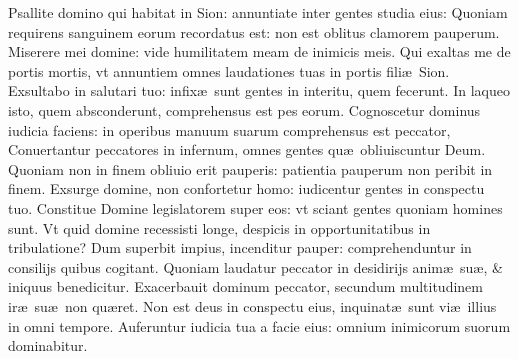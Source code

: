 \documentclass[a5paper,10pt]{book}
\def\ae{æ}
\begin{document}
\begin{multicols*}{2}
\newline \color{red} P\color{black}sallite domino qui habitat in Sion: annuntiate inter gentes studia eius:
\newline \color{red} Q\color{black}uoniam requirens sanguinem eorum recordatus est: non est oblitus clamorem pauperum.
\newline \color{red} M\color{black}iserere mei domine: vide humilitatem meam de inimicis meis.
\newline \color{red} Q\color{black}ui exaltas me de portis mortis, vt annuntiem omnes laudationes tuas in portis fili\ae \ Sion.
\newline \color{red} E\color{black}xsultabo in salutari tuo: infix\ae \ sunt gentes in interitu, quem fecerunt.
\newline \color{red} I\color{black}n laqueo isto, quem absconderunt, comprehensus est pes eorum.
\newline \color{red} C\color{black}ognoscetur dominus iudicia faciens: in operibus manuum suarum comprehensus est peccator, %
\newline \color{red} C\color{black}onuertantur peccatores in infernum, omnes gentes qu\ae \ obliuiscuntur Deum.
\newline \color{red} Q\color{black}uoniam non in finem obliuio erit pauperis: patientia pauperum non peribit in finem.
\newline \color{red} E\color{black}xsurge domine, non confortetur homo: iudicentur gentes in conspectu tuo.
\newline \color{red} C\color{black}onstitue Domine legislatorem super eos: vt sciant gentes quoniam homines sunt.
\newline \color{red} V\color{black}t quid domine recessisti longe, despicis in opportunitatibus in tribulatione?
\newline \color{red} D\color{black}um superbit impius, incenditur pauper: comprehenduntur in consilijs quibus cogitant.
\newline \color{red} Q\color{black}uoniam laudatur peccator in desidirijs anim\ae \ su\ae , \& iniquus benedicitur.
\newline \color{red} E\color{black}xacerbauit dominum peccator, secundum multitudinem ir\ae \ su\ae \ non qu\ae ret.
\newline \color{red} N\color{black}on est deus in conspectu eius, inquinat\ae \ sunt vi\ae \ illius in omni tempore.
\newline \color{red} A\color{black}uferuntur iudicia tua a facie eius: omnium inimicorum suorum dominabitur.

\end{multicols*}
\end{document}
